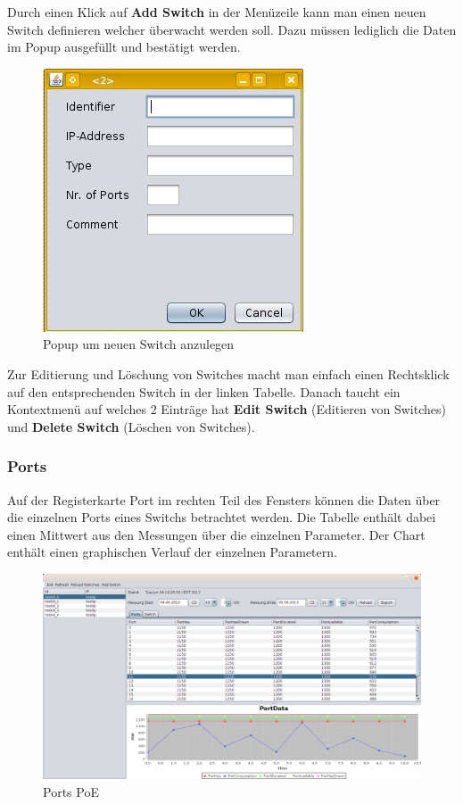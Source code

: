 Durch einen Klick auf \textbf{Add Switch} in der Menüzeile kann man einen neuen
Switch definieren welcher überwacht werden soll. Dazu müssen lediglich die Daten
im Popup ausgefüllt und bestätigt werden. 

 \begin{figure}[h]
    \centering
    \leavevmode
    \includegraphics[scale=0.5]{figures/screenshot3.jpg}
    \caption{Popup um neuen Switch anzulegen}
    \label{fig:NeuerSwitch-PoE}
\end{figure}

Zur Editierung und Löschung von Switches macht man einfach einen Rechtsklick auf
den entsprechenden Switch in der linken Tabelle. Danach taucht ein Kontextmenü
auf welches 2 Einträge hat \textbf{Edit Switch} (Editieren von Switches) und
\textbf{Delete Switch} (Löschen von Switches).

\subsubsection{Ports}

Auf der Registerkarte Port im rechten Teil des Fensters können die Daten über
die einzelnen Ports eines Switchs betrachtet werden. Die Tabelle enthält dabei
einen Mittwert aus den Messungen über die einzelnen Parameter. Der Chart enthält
einen graphischen Verlauf der einzelnen Parametern.

\begin{figure}[h]
    \centering
    \leavevmode
    \includegraphics[width=1.0\linewidth]{figures/screenshot1.png}
    \caption{Ports PoE}
    \label{fig:Ports-PoE}
\end{figure}

